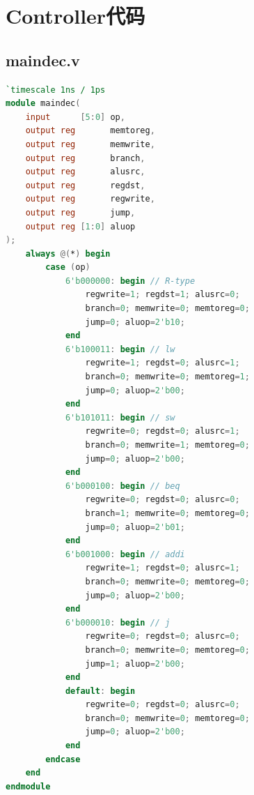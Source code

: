 \appendix
\section{Controller代码}

\subsection{maindec.v}
\begin{lstlisting}[language=Verilog]
`timescale 1ns / 1ps
module maindec(
    input      [5:0] op,
    output reg       memtoreg,
    output reg       memwrite,
    output reg       branch,
    output reg       alusrc,
    output reg       regdst,
    output reg       regwrite,
    output reg       jump,
    output reg [1:0] aluop
);
    always @(*) begin
        case (op)
            6'b000000: begin // R-type
                regwrite=1; regdst=1; alusrc=0;
                branch=0; memwrite=0; memtoreg=0;
                jump=0; aluop=2'b10;
            end
            6'b100011: begin // lw
                regwrite=1; regdst=0; alusrc=1;
                branch=0; memwrite=0; memtoreg=1;
                jump=0; aluop=2'b00;
            end
            6'b101011: begin // sw
                regwrite=0; regdst=0; alusrc=1;
                branch=0; memwrite=1; memtoreg=0;
                jump=0; aluop=2'b00;
            end
            6'b000100: begin // beq
                regwrite=0; regdst=0; alusrc=0;
                branch=1; memwrite=0; memtoreg=0;
                jump=0; aluop=2'b01;
            end
            6'b001000: begin // addi
                regwrite=1; regdst=0; alusrc=1;
                branch=0; memwrite=0; memtoreg=0;
                jump=0; aluop=2'b00;
            end
            6'b000010: begin // j
                regwrite=0; regdst=0; alusrc=0;
                branch=0; memwrite=0; memtoreg=0;
                jump=1; aluop=2'b00;
            end
            default: begin
                regwrite=0; regdst=0; alusrc=0;
                branch=0; memwrite=0; memtoreg=0;
                jump=0; aluop=2'b00;
            end
        endcase
    end
endmodule
\end{lstlisting}

